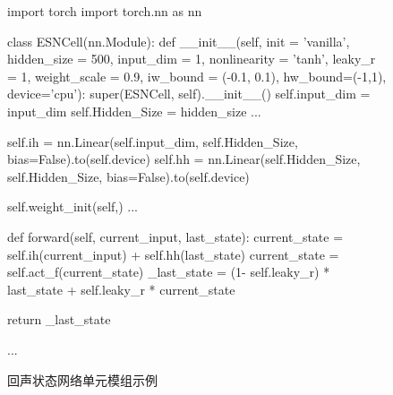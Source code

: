 

\begin{figure}
    \begin{python}
    import torch
    import torch.nn as nn
    
    class ESNCell(nn.Module):
        def __init__(self, init = 'vanilla', hidden_size = 500, input_dim = 1, nonlinearity = 'tanh', leaky_r = 1, weight_scale = 0.9, iw_bound = (-0.1, 0.1), hw_bound=(-1,1),  device='cpu'):
            super(ESNCell, self).__init__()
            self.input_dim = input_dim
            self.Hidden_Size = hidden_size
            ...
        
            self.ih = nn.Linear(self.input_dim, self.Hidden_Size, bias=False).to(self.device)
            self.hh = nn.Linear(self.Hidden_Size, self.Hidden_Size, bias=False).to(self.device)

            self.weight_init(self,)
            ...

        def forward(self, current_input, last_state):
            current_state = self.ih(current_input) + self.hh(last_state)
            current_state = self.act_f(current_state)
            _last_state = (1- self.leaky_r) * last_state + self.leaky_r * current_state
            
            return _last_state

        ...            
    \end{python}
    \caption{回声状态网络单元模组示例\label{fig:ch.univ.esncell}}
\end{figure}

